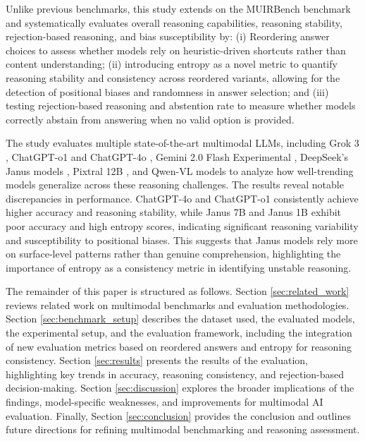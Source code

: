  Unlike previous benchmarks, this study extends on the MUIRBench benchmark \cite{wang2024muirbench} and systematically evaluates overall reasoning capabilities, reasoning stability, rejection-based reasoning, and bias susceptibility by: (i) Reordering answer choices to assess whether models rely on heuristic-driven shortcuts rather than content understanding; (ii) introducing entropy as a novel metric to quantify reasoning stability and consistency across reordered variants, allowing for the detection of positional biases and randomness in answer selection; and (iii) testing rejection-based reasoning and abstention rate to measure whether models correctly abstain from answering when no valid option is provided.

The study evaluates multiple state-of-the-art multimodal LLMs, including Grok 3 \cite{xai2025grok3}, ChatGPT-o1 and ChatGPT-4o \cite{chatgpt}, Gemini 2.0 Flash Experimental \cite{gemini}, DeepSeek’s Janus models \cite{chen2025janus}, Pixtral 12B \cite{agrawal2024pixtral}, and Qwen-VL models \cite{bai2023qwen} to analyze how well-trending models generalize across these reasoning challenges. The results reveal notable discrepancies in performance. ChatGPT-4o and ChatGPT-o1 consistently achieve higher accuracy and reasoning stability, while Janus 7B and Janus 1B exhibit poor accuracy and high entropy scores, indicating significant reasoning variability and susceptibility to positional biases. This suggests that Janus models rely more on surface-level patterns rather than genuine comprehension, highlighting the importance of entropy as a consistency metric in identifying unstable reasoning.

The remainder of this paper is structured as follows. Section \ref{sec:related_work} reviews related work on multimodal benchmarks and evaluation methodologies. Section \ref{sec:benchmark_setup} describes the dataset used, the evaluated models, the experimental setup, and the evaluation framework, including the integration of new evaluation metrics based on reordered answers and entropy for reasoning consistency. Section \ref{sec:results} presents the results of the evaluation, highlighting key trends in accuracy, reasoning consistency, and rejection-based decision-making. Section \ref{sec:discussion} explores the broader implications of the findings, model-specific weaknesses, and improvements for multimodal AI evaluation. Finally, Section \ref{sec:conclusion} provides the conclusion and outlines future directions for refining multimodal benchmarking and reasoning assessment.
